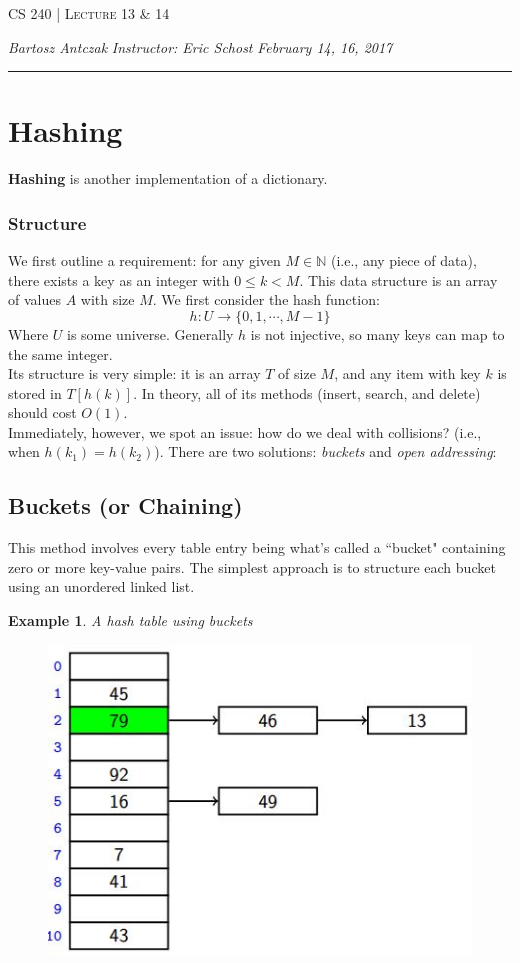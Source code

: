 \documentclass{report}
\newcommand{\curDate}{February 14, 16, 2017}
\newcommand{\course}{CS 240}
\newtheorem{ex}{Example}[section]
\begin{document}
\begin{center}
\begin{Large}
\textsc{\course{} | Lecture 13 \& 14}
\end{Large}
\end{center} 
\noindent \textit{Bartosz Antczak} \hfill
\textit{Instructor: Eric Schost} \hfill
\textit{\curDate{}}
\rule{\textwidth}{0.4pt}

\section{Hashing}
\textbf{Hashing} is another implementation of a dictionary.
\subsubsection{Structure}
We first outline a requirement: for any given $M \in \mathbb{N}$ (i.e., any piece of data), there exists a key as an integer with $0 \leq k < M$. This data structure is an array of values $A$ with size $M$. We first consider the hash function:
$$h: U \rightarrow \{0, 1, \cdots, M-1\}$$
Where $U$ is some universe. Generally $h$ is not injective, so many keys can map to the same integer.\\
Its structure is very simple: it is an array $T$ of size $M$, and any item with key $k$ is stored in $T[h(k)]$. In theory, all of its methods (insert, search, and delete) should cost $O(1)$.\\
Immediately, however, we spot an issue: how do we deal with collisions? (i.e., when $h(k_1) = h(k_2)$). There are two solutions: \textit{buckets} and \textit{open addressing}:
\subsection{Buckets (or Chaining)}
This method involves every table entry being what's called a ``bucket" containing zero or more key-value pairs. The simplest approach is to structure each bucket using an unordered linked list.
\begin{ex}
A hash table using buckets
\end{ex}
\begin{center}
\begin{figure}[ht]
\includegraphics[scale=0.5]{table1.jpg}
\end{figure}
\end{center}
\end{document}
